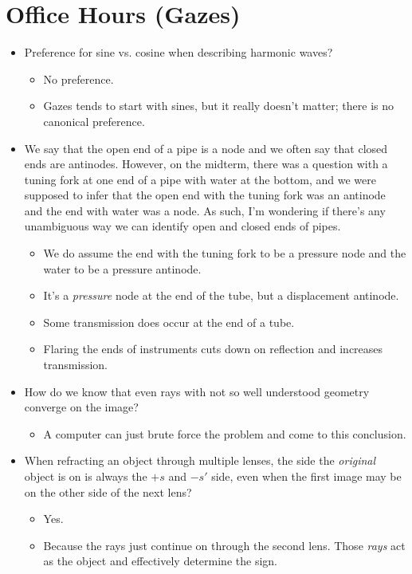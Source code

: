 \documentclass[../notes.tex]{subfiles}
\begin{document}
\section{Office Hours (Gazes)}
\begin{itemize}
    \item Preference for sine vs. cosine when describing harmonic waves?
    \begin{itemize}
        \item No preference.
        \item Gazes tends to start with sines, but it really doesn't matter; there is no canonical preference.
    \end{itemize}
    \item We say that the open end of a pipe is a node and we often say that closed ends are antinodes. However, on the midterm, there was a question with a tuning fork at one end of a pipe with water at the bottom, and we were supposed to infer that the open end with the tuning fork was an antinode and the end with water was a node. As such, I'm wondering if there's any unambiguous way we can identify open and closed ends of pipes.
    \begin{itemize}
        \item We do assume the end with the tuning fork to be a pressure node and the water to be a pressure antinode.
        \item It's a \emph{pressure} node at the end of the tube, but a displacement antinode.
        \item Some transmission does occur at the end of a tube.
        \item Flaring the ends of instruments cuts down on reflection and increases transmission.
    \end{itemize}
    \item How do we know that even rays with not so well understood geometry converge on the image?
    \begin{itemize}
        \item A computer can just brute force the problem and come to this conclusion.
    \end{itemize}
    \item When refracting an object through multiple lenses, the side the \emph{original} object is on is always the $+s$ and $-s'$ side, even when the first image may be on the other side of the next lens?
    \begin{itemize}
        \item Yes.
        \item Because the rays just continue on through the second lens. Those \emph{rays} act as the object and effectively determine the sign.

\end{itemize}
\end{itemize}
\end{document}
